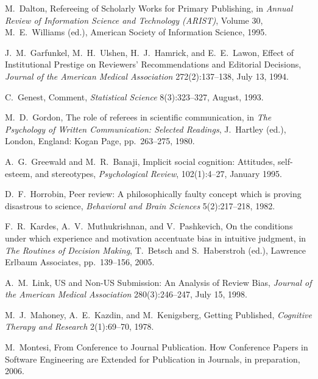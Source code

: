 \documentclass[acmtods,acmnow]{acmtrans2m}
\begin{document}
\begin{thebibliography}{}
{\sc M.~Dalton}, Refereeing of Scholarly Works for Primary Publishing, in {\em
  Annual Review of Information Science and Technology (ARIST)}, Volume 30,
{\sc M.~E.~Williams} (ed.), American Society of Information Science, 1995.

{\sc J.~M.~Garfunkel, M.~H.~Ulshen, H.~J.~Hamrick, and E.~E.~Lawon}, Effect of
Institutional Prestige on Reviewers' Recommendations and Editorial
Decisions, {\em Journal of the American Medical Association}
272(2):137--138, July 13, 1994.

{\sc C.~Genest}, Comment, {\em Statistical Science} 8(3):323--327, August,
1993.

{\sc M.~D.~Gordon}, The role of referees in scientific communication, in {\em
The Psychology of Written Communication: Selected Readings}, {\sc J.~Hartley}
(ed.), London, England: Kogan Page, pp.~263--275, 1980.

{\sc A.~G.~Greewald and M.~R.~Banaji}, Implicit social cognition: Attitudes,
self-esteem, and stereotypes, {\em Psychological Review}, 102(1):4--27,
January 1995.

{\sc D.~F.~Horrobin}, Peer review: A philosophically faulty concept which is
proving disastrous to science, {\em Behavioral and Brain
Sciences} 5(2):217--218, 1982.

{\sc F.~R.~Kardes, A.~V.~Muthukrishnan, and V.~Pashkevich}, On the
conditions under which experience and motivation accentuate bias in
intuitive judgment, in {\em The Routines of Decision Making}, {\sc
  T.~Betsch and S.~Haberstroh} (ed.), Lawrence Erlbaum Associates,
pp.~139--156, 2005.

{\sc A.~M.~Link}, US and Non-US Submission: An Analysis of Review Bias, {\em
  Journal of the American Medical Association} 280(3):246--247, July 15, 1998.

{\sc M.~J.~Mahoney, A.~E.~Kazdin, and M.~Kenigsberg}, Getting Published, {\em
Cognitive Therapy and Research} 2(1):69--70, 1978.

{\sc M.~Montesi}, From Conference to Journal Publication. How Conference Papers
in Software Engineering are Extended for Publication in Journals, in
preparation, 2006.


\end{thebibliography}
\end{document}
